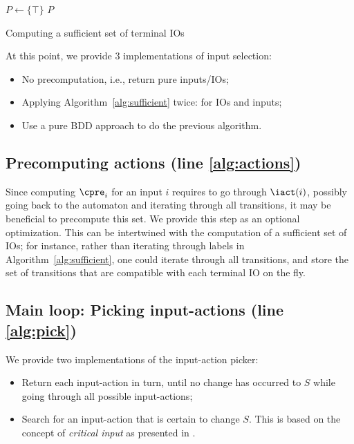 \documentclass[sigconf,screen,nonacm]{acmart}
\begin{document}
\begin{algorithm}

\BlankLine
\(P \leftarrow \{\top\}\)\;
\Return \(P\)
\caption{Computing a sufficient set of terminal IOs}
\label{alg:sufficient}
\end{algorithm}

At this point, we provide 3 implementations of input selection:
\begin{itemize}
\item No precomputation, i.e., return pure inputs/IOs;
\item Applying Algorithm~\ref{alg:sufficient} twice: for IOs and inputs;
\item Use a pure BDD approach to do the previous algorithm.
\end{itemize}

\subsection{Precomputing actions (line \ref{alg:actions})}

Since computing \(\cpre_i\) for an input \(i\) requires to go through
\(\iact(i)\), possibly going back to the automaton and iterating through all
transitions, it may be beneficial to precompute this set.  We provide this step
as an optional optimization.  This can be intertwined with the computation of a
sufficient set of IOs; for instance, rather than iterating through labels in
Algorithm~\ref{alg:sufficient}, one could iterate through all transitions, and
store the set of transitions that are compatible with each terminal IO on the
fly.

\subsection{Main loop: Picking input-actions (line \ref{alg:pick})}

We provide two implementations of the input-action picker:
\begin{itemize}
\item Return each input-action in turn, until no change has occurred to \(S\)
  while going through all possible input-actions;
\item Search for an input-action that is certain to change \(S\).  This is based
  on the concept of \emph{critical input} as presented in \cite{bohy14}.
\end{itemize}
\end{document}
